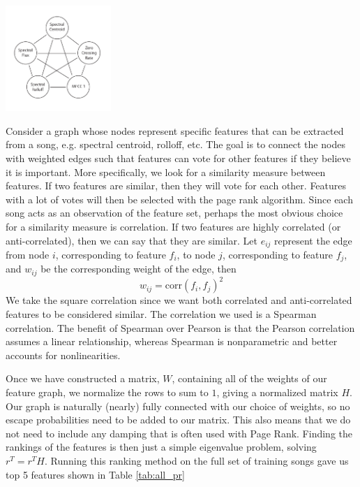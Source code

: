 \documentclass[12pt]{article}
\begin{document}
\begin{center}
\includegraphics[width=0.3\textwidth]{figures/featGraph.pdf}
\end{center}

Consider a graph whose nodes represent specific features that can be extracted from a song, e.g. spectral centroid, rolloff, etc.  The goal is to connect the nodes with weighted edges such that features can vote for other features if they believe it is important.  More specifically, we look for a similarity measure between features.  If two features are similar, then they will vote for each other.  Features with a lot of votes will then be selected with the page rank algorithm.  Since each song acts as an observation of the feature set, perhaps the most obvious choice for a similarity measure is correlation.  If two features are highly correlated (or anti-correlated), then we can say that they are similar.  Let $e_{ij}$ represent the edge from node $i$, corresponding to feature $f_i$, to node $j$, corresponding to feature $f_j$, and $w_{ij}$ be the corresponding weight of the edge, then
$$w_{ij} = \text{corr}(f_i,f_j)^2$$
We take the square correlation since we want both correlated and anti-correlated features to be considered similar.  The correlation we used is a Spearman correlation.  The benefit of Spearman over Pearson is that the Pearson correlation assumes a linear relationship, whereas Spearman is nonparametric and better accounts for nonlinearities.

Once we have constructed a matrix, $W$, containing all of the weights of our feature graph, we normalize the rows to sum to $1$, giving a normalized matrix $H$.  Our graph is naturally (nearly) fully connected with our choice of weights, so no escape probabilities need to be added to our matrix.  This also means that we do not need to include any damping that is often used with Page Rank.  Finding the rankings of the features is then just a simple eigenvalue problem, solving $r^T = r^T H$.  Running this ranking method on the full set of training songs gave us top 5 features shown in Table \ref{tab:all_pr}
\end{document}
